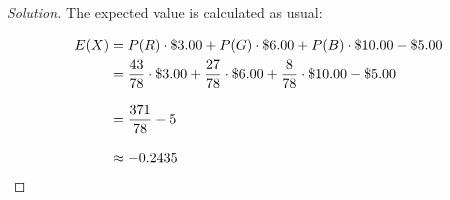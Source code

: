\documentclass[titlepage, letterpaper, fleqn]{article}
\renewcommand\qedsymbol{\(\blacksquare\)}
\newenvironment{solution}
{\renewcommand\qedsymbol{$\square$}\begin{proof}[Solution]}
{\end{proof}}
\begin{document}
\begin{solution}
The expected value is calculated as usual:

\begin{align*}
E(X) & = P(R) \cdot \$ 3.00 + P(G) \cdot \$ 6.00 + P(B) \cdot \$ 10.00 - \$ 5.00 \\
& = \frac{43}{78} \cdot \$ 3.00 + \frac{27}{78} \cdot \$ 6.00 + \frac{8}{78} \cdot \$ 10.00 - \$ 5.00 \\[2ex]
& = \frac{371}{78} - 5 \\[2ex]
& \approx -0.2435 \qedhere
\end{align*}
\end{solution}
\end{document}
